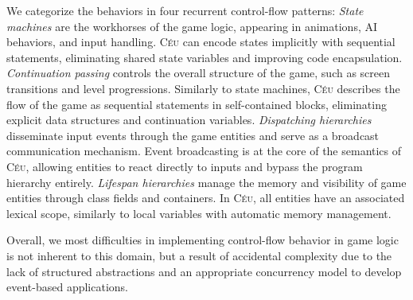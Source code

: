 \documentclass[times,twocolumn,final]{elsarticle}
\newcommand{\CEU}{\textsc{C\'{e}u}\xspace}
\begin{document}
We categorize the behaviors in four recurrent control-flow patterns:
%
\emph{State machines} are the workhorses of the game logic, appearing in
animations, AI behaviors, and input handling.
\CEU can encode states implicitly with sequential statements,
eliminating shared state variables and improving code encapsulation.
%
\emph{Continuation passing} controls the overall structure of the game, such as
screen transitions and level progressions.
Similarly to state machines, \CEU describes the flow of the game as sequential
statements in self-contained blocks, eliminating explicit data structures and
continuation variables.
%
\emph{Dispatching hierarchies} disseminate input events through the game
entities and serve as a broadcast communication mechanism.
Event broadcasting is at the core of the semantics of \CEU, allowing entities
to react directly to inputs and bypass the program hierarchy entirely.
%
\emph{Lifespan hierarchies} manage the memory and visibility of game entities
through class fields and containers.
In \CEU, all entities have an associated lexical scope, similarly to local
variables with automatic memory management.

Overall, we most difficulties in implementing control-flow behavior in game
logic is not inherent to this domain, but a result of accidental complexity due
to the lack of structured abstractions and an appropriate concurrency model to
develop event-based applications.

\newpage


\end{document}
